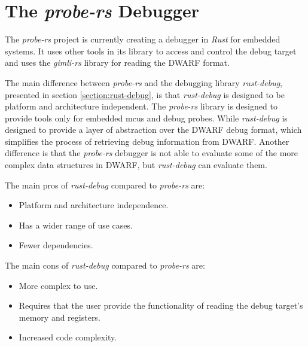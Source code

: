 \section{The \emph{probe-rs} Debugger}

The \emph{probe-rs} project is currently creating a debugger in \emph{Rust} for embedded systems.
It uses other tools in its library to access and control the debug target and uses the \emph{gimli-rs} library for reading the \gls{DWARF} format.


The main difference between \emph{probe-rs} and the debugging library \emph{rust-debug}, presented in section \ref{section:rust-debug}, is that \emph{rust-debug} is designed to be platform and architecture independent.
The \emph{probe-rs} library is designed to provide tools only for embedded \glspl{mcu} and debug probes.
While \emph{rust-debug} is designed to provide a layer of abstraction over the \gls{DWARF} debug format, which simplifies the process of retrieving debug information from \gls{DWARF}.
Another difference is that the \emph{probe-rs} debugger is not able to evaluate some of the more complex data structures in \gls{DWARF}, but \emph{rust-debug} can evaluate them.

The main pros of \emph{rust-debug} compared to \emph{probe-rs} are:
\begin{itemize}
  \item Platform and architecture independence.
  \item Has a wider range of use cases.
  \item Fewer dependencies.
\end{itemize}

The main cons of \emph{rust-debug} compared to \emph{probe-rs} are:
\begin{itemize}
  \item More complex to use.
  \item Requires that the user provide the functionality of reading the debug target's memory and registers.
  \item Increased code complexity.
\end{itemize}



